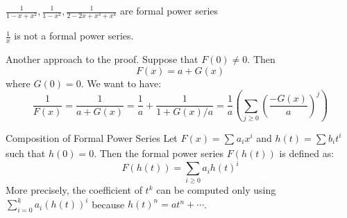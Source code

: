 \documentclass{report}
\begin{document}
\begin{examples}
    \begin{example}
        $\frac{1}{1 - x + x^{2}}, \frac{1}{1 - x^{2}}, \frac{1}{2 - 2x + x^{3} + x^{4}}$ are formal power series
    \end{example}
    \begin{example}
        $\frac{1}{x}$ is not a formal power series.
    \end{example}
\end{examples}

Another approach to the proof. Suppose that $F(0) \neq 0$. Then 
    \begin{equation*}
        F(x) = a + G(x)
    \end{equation*}
where $G(0) = 0$. We want to have:
    \begin{equation*}
        \dfrac{1}{F(x)} = \dfrac{1}{a + G(x)} = \dfrac{1}{a} + \dfrac{1}{1 + G(x)/a} = \dfrac{1}{a}\left(\sum_{j \geq 0}^{} \left(\dfrac{-G(x)}{a}\right)^{j}\right)
    \end{equation*}

\begin{definition}{Composition of Formal Power Series}
    Let $F(x) = \sum_{}^{} a_{i}x^{i}$ and $h(t) = \sum_{}^{} b_{i}t^{i}$ such that $h(0) = 0$. Then the formal power series $F(h(t))$ is defined as:
        \begin{equation*}
            F(h(t)) = \sum_{i \geq 0}^{} a_{i}h(t)^{i}
        \end{equation*}
    More precisely, the coefficient  of $t^{k}$ can be computed only using $\sum_{i = 0}^{k} a_{i}(h(t))^{i}$ because $h(t)^{n} = at^{n} + \cdots $.
\end{definition}
\end{document}
